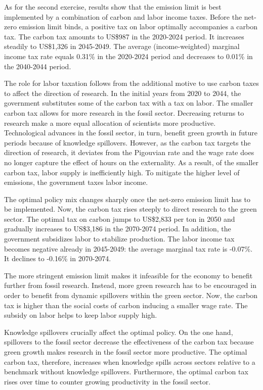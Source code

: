 As for the second exercise, results show that the emission limit is best implemented by a combination of carbon and labor income taxes. Before the net-zero emission limit binds, a positive tax on labor optimally accompanies a carbon tax. The carbon tax amounts to US\$987 in the 2020-2024 period. It increases steadily to US\$1,326 in 2045-2049. The average (income-weighted) marginal income tax rate equals 0.31\% in the 2020-2024 period and decreases to 0.01\% in the 2040-2044 period.

The role for labor taxation follows from the additional motive to use carbon taxes to affect the direction of research. In the initial years from 2020 to 2044, the government substitutes some of the carbon tax with a tax on labor. The smaller carbon tax allows for more research in the fossil sector. Decreasing returns to research make a more equal allocation of scientists more productive. Technological advances in the fossil sector, in turn, benefit green growth in future periods because of knowledge spillovers. However, as the carbon tax targets the direction of research, it deviates from the Pigouvian rate and the wage rate does no longer capture the effect of hours on the externality. As a result, of the smaller carbon tax, labor supply is inefficiently high.
To mitigate the higher level of emissions, the government taxes labor income.

The optimal policy mix changes sharply once the net-zero emission limit has to be implemented. Now, the carbon tax rises steeply to direct research to the green sector. The optimal tax on carbon jumps to US\$2,833 per ton in 2050 and gradually increases to US\$3,186 in the 2070-2074 period. In addition, the government subsidizes labor to stabilize production. The labor income tax becomes negative already in 2045-2049: the average marginal tax rate is -0.07\%. It declines to -0.16\% in 2070-2074.

 The more stringent emission limit makes it infeasible for the economy to benefit further from fossil research. Instead, more green research has to be encouraged in order to benefit from dynamic spillovers within the green sector. Now, the carbon tax is higher than the social costs of carbon inducing a smaller wage rate. The subsidy on labor helps to keep labor supply high.

Knowledge spillovers crucially affect the optimal policy. On the one hand, spillovers to the fossil sector decrease the effectiveness of the carbon tax because green growth makes research in the fossil sector more productive. The optimal carbon tax, therefore, increases when knowledge spills across sectors relative to a benchmark without knowledge spillovers. Furthermore, the optimal carbon tax rises over time to counter growing productivity in the fossil sector. 

